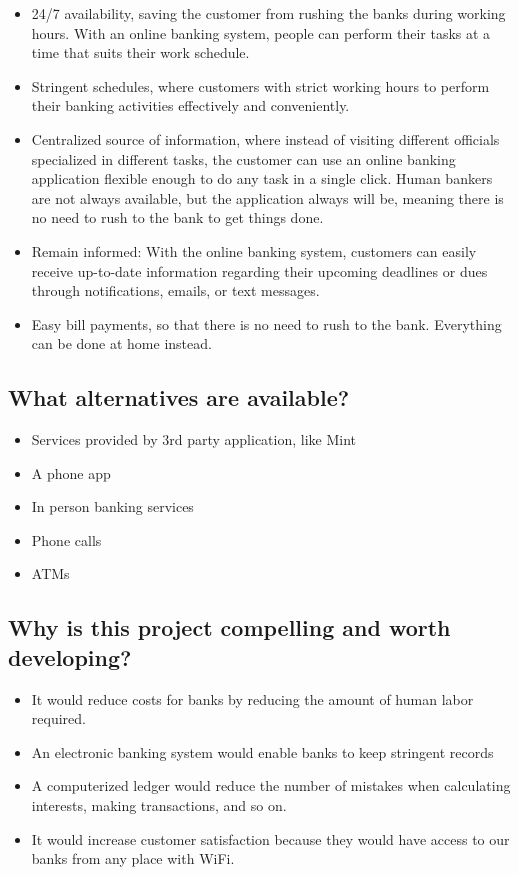 \documentclass[
10pt, %
letterpaper, %
oneside, %
headinclude,footinclude, %
BCOR5mm, %
]{scrartcl}
\begin{document}
\begin{itemize}
\item
  24/7 availability, saving the customer from rushing the banks during
  working hours. With an online banking system, people can perform their
  tasks at a time that suits their work schedule.
\item
  Stringent schedules, where customers with strict working hours to
  perform their banking activities effectively and conveniently.
\item
  Centralized source of information, where instead of visiting different
  officials specialized in different tasks, the customer can use an
  online banking application flexible enough to do any task in a single
  click. Human bankers are not always available, but the application
  always will be, meaning there is no need to rush to the bank to get
  things done.
\item
  Remain informed: With the online banking system, customers can easily
  receive up-to-date information regarding their upcoming deadlines or
  dues through notifications, emails, or text messages.
\item
  Easy bill payments, so that there is no need to rush to the bank.
  Everything can be done at home instead.
\end{itemize}

\subsection{What alternatives are
available?}

\begin{itemize}
\item
  Services provided by 3rd party application, like Mint
\item
  A phone app
\item
  In person banking services
\item
  Phone calls
\item
  ATMs
\end{itemize}

\subsection{Why is this project compelling and worth
developing?}

\begin{itemize}
\item
  It would reduce costs for banks by reducing the amount of human labor
  required.
\item
  An electronic banking system would enable banks to keep stringent
  records
\item
  A computerized ledger would reduce the number of mistakes when
  calculating interests, making transactions, and so on.
\item
  It would increase customer satisfaction because they would have
  access to our banks from any place with WiFi.
\end{itemize}
\end{document}
